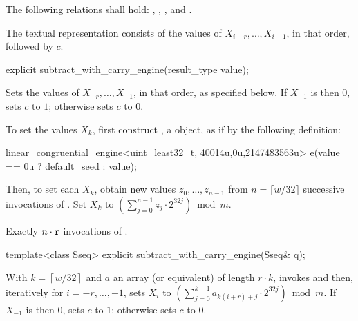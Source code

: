 \pnum
The following relations shall hold:
  ,
  ,
  ,
and
  .

\pnum
The textual representation
consists of the values of
 $X_{i-r}, \dotsc, X_{i-1}$,
in that order, followed by $c$.

%
\begin{itemdecl}
explicit subtract_with_carry_engine(result_type value);
\end{itemdecl}

\begin{itemdescr}
\pnum
\effects
 Sets the values of
 $X_{-r}, \dotsc, X_{-1}$,
 in that order, as specified below.
 If $X_{-1}$ is then $0$,
 sets $c$ to $1$;
 otherwise sets $c$ to $0$.

 To set the values $X_k$,
 first construct , a  object,
 as if by the following definition:
\begin{codeblock}
linear_congruential_engine<uint_least32_t,
                          40014u,0u,2147483563u> e(value == 0u ? default_seed : value);
\end{codeblock}
 Then, to set each $X_k$,
 obtain new values $z_0, \dotsc, z_{n-1}$
 from $n = \lceil w/32 \rceil$ successive invocations
 of .
 Set $X_k$ to $\left( \sum_{j=0}^{n-1} z_j \cdot 2^{32j}\right) \bmod m$.

\pnum
\complexity
Exactly $n \cdot \texttt{\protect r}$ invocations
 of .
\end{itemdescr}

%
\begin{itemdecl}
template<class Sseq> explicit subtract_with_carry_engine(Sseq& q);
\end{itemdecl}

\begin{itemdescr}
\pnum
\effects
 With
 $k = \left\lceil w / 32 \right\rceil$
 and $a$ an array (or equivalent)
 of length $r \cdot k$,
 invokes 
 and then, iteratively for $i = -r, \dotsc, -1$,
 sets $X_i$
 to $ \left(\sum_{j=0}^{k-1}a_{k(i+r)+j} \cdot 2^{32j} \right) \bmod m $.
 If $X_{-1}$ is then $0$,
 sets $c$ to $1$;
 otherwise sets $c$ to $0$.
\end{itemdescr}




